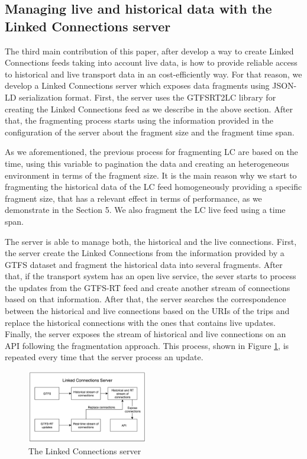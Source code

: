 \documentclass[sw]{iosart2x}
\begin{document}
\subsection{Managing live and historical data with the Linked Connections server}
The third main contribution of this paper, after develop a way to create Linked Connections feeds taking into account live data, is how to provide reliable access to historical and live transport data in an cost-efficiently way. For that reason, we develop a Linked Connections server which exposes data fragments using JSON-LD serialization format. First, the server uses the GTFSRT2LC library for creating the Linked Connections feed as we describe in the above section. After that, the fragmenting process starts using the information provided in the configuration of the server about the fragment size and the fragment time span. 

As we aforementioned, the previous process for fragmenting LC are based on the time, using this variable to pagination the data and creating an heterogeneous environment in terms of the fragment size. It is the main reason why we start to fragmenting the historical data of the LC feed homogeneously providing a specific fragment size, that has a relevant effect in terms of performance, as we demonstrate in the Section 5. We also fragment the LC live feed using a time span. 

The server is able to manage both, the historical and the live connections. First, the server create the Linked Connections from the information provided by a GTFS dataset and fragment the historical data into several fragments. After that, if the transport system has an open live service, the sever starts to process the updates from the GTFS-RT feed and create another stream of connections based on that information. After that, the server searches the correspondence between the historical and live connections based on the URIs of the trips and replace the historical connections with the ones that contains live updates. Finally, the server exposes the stream of historical and live connections on an API following the fragmentation approach. This process, shown in Figure \ref{fig:lc_server}, is repeated every time that the server process an update.

\begin{figure}[t]
	\includegraphics[width=0.47\textwidth]{images/lc_server.png}
	\caption{The Linked Connections server}\label{fig:lc_server}
\end{figure}
\end{document}
